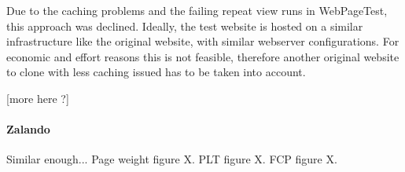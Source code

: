 Due to the caching problems and the failing repeat view runs in WebPageTest, this approach was declined.
Ideally, the test website is hosted on a similar infrastructure like the original website, with similar webserver configurations.
For economic and effort reasons this is not feasible, therefore another original website to clone with less caching issued has to be taken into account.

[more here ?]










\paragraph{Zalando}








Similar enough...
Page weight figure X.
PLT figure X.
FCP figure X.


